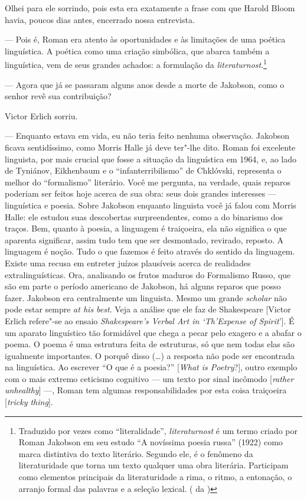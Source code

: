 {Olhei para ele sorrindo, pois esta era exatamente a frase com que Harold
Bloom havia, poucos dias antes, encerrado nossa entrevista.

--- Pois é, Roman era atento às oportunidades e às limitações de uma
poética linguística. A poética como uma criação simbólica, que abarca
também a linguística, vem de seus grandes achados: a formulação da
\emph{literaturnost}.\footnote{Traduzido por vezes como 
``literalidade'', \emph{literaturnost} é um termo criado por Roman 
Jakobson em seu estudo ``A novíssima poesia russa'' 
(1922) como marca distintiva do texto literário. Segundo ele, é o
 fenômeno da literaturidade que torna um texto qualquer uma obra
 literária. Participam como elementos principais da literaturidade 
a rima, o ritmo, a entonação, o arranjo formal das palavras e a
 seleção lexical. ( da )}

--- Agora que já se passaram alguns anos desde a morte de Jakobson, como o
senhor revê sua contribuição?

Victor Erlich sorriu.

--- Enquanto estava em vida, eu não teria feito nenhuma observação.
Jakobson ficava sentidíssimo, como Morris Halle já deve ter"-lhe dito.
Roman foi excelente linguista, por mais crucial que fosse a situação da
linguística em 1964, e, ao lado de Tyniánov, Eikhenbaum e o
``infanterribilismo'' de Chklóvski, representa o melhor do
``formalismo'' literário. Você me pergunta, na verdade, quais reparos poderiam ser feitos
hoje acerca de sua obra: seus dois grandes interesses --- linguística e
poesia. Sobre Jakobson enquanto linguista você já falou com Morris Halle: ele
estudou suas descobertas surpreendentes, como a do binarismo dos traços.
Bem, quanto à poesia, a linguagem é traiçoeira, ela não significa o que
aparenta significar, assim tudo tem que ser desmontado, revirado,
reposto. A linguagem é noção. Tudo o que fazemos é feito através do sentido da
linguagem. Existe uma recusa em entreter juízos plausíveis acerca de
realidades extralinguísticas. Ora, analisando os frutos maduros do Formalismo Russo, que são em parte
o período americano de Jakobson, há alguns reparos que posso fazer.
 Jakobson era centralmente um linguista. Mesmo um grande \emph{scholar} não pode
estar sempre \emph{at his best}.
Veja a análise que ele faz de Shakespeare [Victor Erlich
 refere"-se ao ensaio \emph{Shakespeare's Verbal Art in `Th'Expense of
 Spirit}']. É um aparato linguístico tão formidável que chega a
pecar pelo exagero e a abafar o poema. O poema é uma estrutura feita de
estruturas, só que nem todas elas são igualmente importantes. O porquê
disso (\ldots{}) a resposta não pode ser encontrada na linguística.
 Ao escrever ``O que é a poesia?'' [\emph{What is
 Poetry}?], outro exemplo com o mais extremo
ceticismo cognitivo --- um texto por sinal incômodo [\emph{rather
unhealthy}] ---, Roman tem algumas responsabilidades por esta coisa
traiçoeira [\emph{tricky thing}].

}
